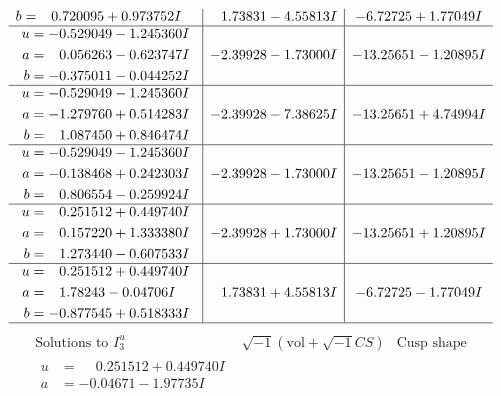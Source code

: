 \documentclass[1p]{elsarticle_modified}
\theoremstyle{definition}
\newcommand{\I}{\sqrt{-1}}
\begin{document}
$$\begin{array}{c|c|c}
\begin{aligned}
b &= \phantom{-}0.720095 + 0.973752 I\end{aligned}
 & \phantom{-}1.73831 - 4.55813 I & -6.72725 + 1.77049 I \\ \hline\begin{aligned}
u &= -0.529049 - 1.245360 I \\
a &= \phantom{-}0.056263 - 0.623747 I \\
b &= -0.375011 - 0.044252 I\end{aligned}
 & -2.39928 - 1.73000 I & -13.25651 - 1.20895 I \\ \hline\begin{aligned}
u &= -0.529049 - 1.245360 I \\
a &= -1.279760 + 0.514283 I \\
b &= \phantom{-}1.087450 + 0.846474 I\end{aligned}
 & -2.39928 - 7.38625 I & -13.25651 + 4.74994 I \\ \hline\begin{aligned}
u &= -0.529049 - 1.245360 I \\
a &= -0.138468 + 0.242303 I \\
b &= \phantom{-}0.806554 - 0.259924 I\end{aligned}
 & -2.39928 - 1.73000 I & -13.25651 - 1.20895 I \\ \hline\begin{aligned}
u &= \phantom{-}0.251512 + 0.449740 I \\
a &= \phantom{-}0.157220 + 1.333380 I \\
b &= \phantom{-}1.273440 - 0.607533 I\end{aligned}
 & -2.39928 + 1.73000 I & -13.25651 + 1.20895 I \\ \hline\begin{aligned}
u &= \phantom{-}0.251512 + 0.449740 I \\
a &= \phantom{-}1.78243 - 0.04706 I \\
b &= -0.877545 + 0.518333 I\end{aligned}
 & \phantom{-}1.73831 + 4.55813 I & -6.72725 - 1.77049 I\\
 \hline 
 \end{array}$$\newpage$$\begin{array}{c|c|c}  
\text{Solutions to }I^u_{3}& \I (\text{vol} + \sqrt{-1}CS) & \text{Cusp shape}\\
 \hline 
\begin{aligned}
u &= \phantom{-}0.251512 + 0.449740 I \\
a &= -0.04671 - 1.97735 I \\

\end{aligned}
\end{array}$$
\end{document}
